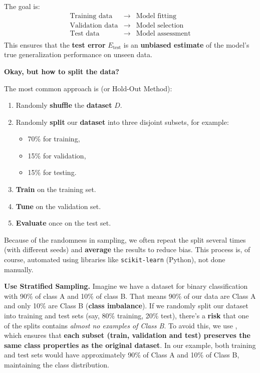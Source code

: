 \noindent
The goal is:
\begin{equation*}
    \begin{array}{rcl}
        \text{Training data} & \rightarrow & \text{Model fitting} \\
        \text{Validation data} & \rightarrow & \text{Model selection} \\
        \text{Test data} & \rightarrow & \text{Model assessment} \\
    \end{array}
\end{equation*}
This ensures that the \textbf{test error} $E_{\text{test}}$ is an \textbf{unbiased estimate} of the model's true generalization performance on unseen data.

\highspace
\begin{flushleft}
    \textcolor{Green3}{ \textbf{Okay, but how to split the data?}}
\end{flushleft}
The most common approach is  (or Hold-Out Method):
\begin{enumerate}
    \item Randomly \textbf{shuffle} the \textbf{dataset} $D$.
    \item Randomly \textbf{split} our \textbf{dataset} into three disjoint subsets, for example:
    \begin{itemize}
        \item 70\% for training,
        \item 15\% for validation,
        \item 15\% for testing.
    \end{itemize}
    \item \textbf{Train} on the training set.
    \item \textbf{Tune} on the validation set.
    \item \textbf{Evaluate} once on the test set.
\end{enumerate}
Because of the randomness in sampling, we often repeat the split several times (with different seeds) and \textbf{average} the results to reduce bias. This process is, of course, automated using libraries like \texttt{scikit-learn} (Python), not done manually.

\highspace
\textcolor{Red2}{ \textbf{Use Stratified Sampling.}}\label{def:stratified-sampling} Imagine we have a dataset for binary classification with 90\% of class A and 10\% of class B. That means 90\% of our data are Class A and only 10\% are Class B (\textbf{class imbalance}). If we randomly split our dataset into training and test sets (say, 80\% training, 20\% test), there's a \textbf{risk} that one of the splits contains \emph{almost no examples of Class B}. To avoid this, we use , which ensures that \textbf{each subset (train, validation and test) preserves the same class properties as the original dataset}. In our example, both training and test sets would have approximately 90\% of Class A and 10\% of Class B, maintaining the class distribution. 